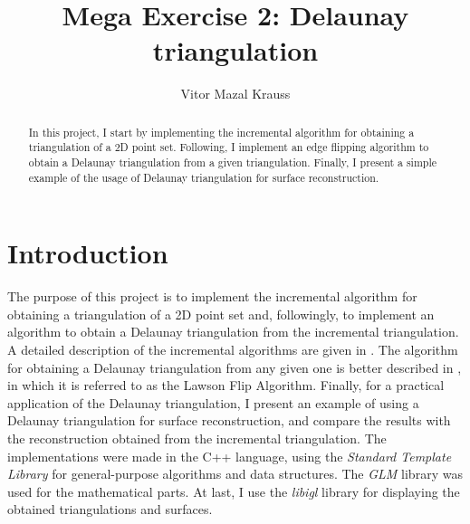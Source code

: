 \documentclass[a4paper, 10pt, conference]{ieeeconf}      %
\title{\LARGE \bf
Mega Exercise 2: Delaunay triangulation
}
\author{Vitor Mazal Krauss}
\begin{document}
\maketitle
\thispagestyle{empty}
\pagestyle{empty}


\begin{abstract}
In this project, I start by implementing the incremental algorithm for obtaining a triangulation of a 2D point set.
Following, I implement an edge flipping algorithm to obtain a Delaunay triangulation from a given triangulation.
Finally, I present a simple example of the usage of Delaunay triangulation for surface reconstruction.
\end{abstract}


\section{Introduction}
The purpose of this project is to implement the incremental algorithm for obtaining a triangulation of a 2D point set and, followingly, to implement an algorithm to obtain a Delaunay triangulation from the incremental triangulation. 
A detailed description of the incremental algorithms are given in \cite{dcg, cg13}.
The algorithm for obtaining a Delaunay triangulation from any given one is better described in \cite{cg13}, in which it is referred to as the Lawson Flip Algorithm.
Finally, for a practical application of the Delaunay triangulation, I present an example of using a Delaunay triangulation for surface reconstruction, and compare the results with the reconstruction obtained from the incremental triangulation. 
The implementations were made in the C++ language, using the \textit{Standard Template Library} for general-purpose algorithms and data structures.
The \textit{GLM} library was used for the mathematical parts.
At last, I use the \textit{libigl} library for displaying the obtained triangulations and surfaces.
\end{document}
